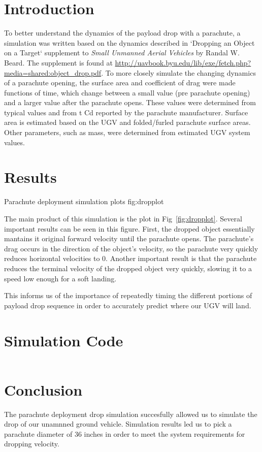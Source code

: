 \documentclass[]{auvsi_doc}
\begin{document}
\begin{AUVSITitlePage}
\begin{artifacttable}
\end{artifacttable}
\end{AUVSITitlePage}


\section*{Introduction}
To better understand the dynamics of the payload drop with a parachute, a simulation was written based on the dynamics described in `Dropping an Object on a Target` supplement to \textit{Small Unmanned Aerial Vehicles} by Randal W. Beard.
The supplement is found at \url{http://uavbook.byu.edu/lib/exe/fetch.php?media=shared:object_drop.pdf}.
To more closely simulate the changing dynamics of a parachute opening, the surface area and coefficient of drag were made functions of time, which change between a small value (pre parachute opening) and a larger value after the parachute opens. These values were determined from typical values and from t Cd reported by the parachute manufacturer. Surface area is estimated based on the UGV and folded/furled parachute surface areas. Other parameters, such as mass, were determined from estimated UGV system values.

\section*{Results}
{\textwidth}
{Parachute deployment simulation plots}
{fig:dropplot}

The main product of this simulation is the plot in Fig~\ref{fig:dropplot}. Several important results can be seen in this figure. First, the dropped object essentially mantains it original forward velocity until the parachute opens. The parachute's drag occurs in the direction of the object's velocity, so the parachute very quickly reduces horizontal velocities to 0.
Another important result is that the parachute reduces the terminal velocity of the dropped object very quickly, slowing it to a speed low enough for a soft landing.

This informs us of the importance of repeatedly timing the different portions of payload drop sequence in order to accurately predict where our UGV will land.

\section*{Simulation Code}
\inputminted[fontsize=\footnotesize]{python}{drop.py}
\section*{Conclusion}

The parachute deployment drop simulation succesfully allowed us to simulate the drop of our unamnned ground vehicle. Simulation results led us to pick a parachute diameter of 36 inches in order to meet the system requirements for dropping velocity.
\end{document}
